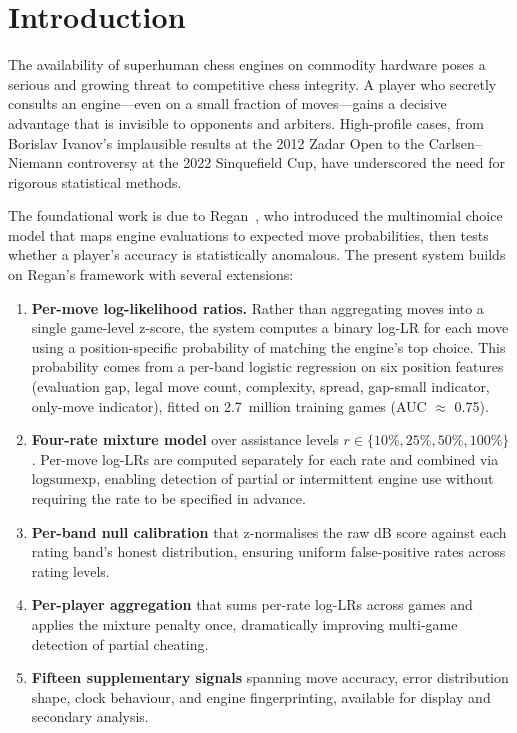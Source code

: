\documentclass[11pt,a4paper]{article}
\theoremstyle{definition}
\begin{document}
\section{Introduction}
\label{sec:intro}

The availability of superhuman chess engines on commodity hardware poses a
serious and growing threat to competitive chess integrity.  A player
who secretly consults an engine---even on a small fraction of
moves---gains a decisive advantage that is invisible to opponents and
arbiters.  High-profile cases, from Borislav Ivanov's implausible
results at the 2012 Zadar Open to the Carlsen--Niemann controversy at
the 2022 Sinquefield Cup, have underscored the need for rigorous
statistical methods.

The foundational work is due to
Regan~\citep{regan2011understanding,regan2014cheating}, who introduced
the multinomial choice model that maps engine evaluations to expected
move probabilities, then tests whether a player's accuracy is
statistically anomalous.  The present system builds on Regan's framework with
several extensions:

\begin{enumerate}[nosep]
  \item \textbf{Per-move log-likelihood ratios.}  Rather than
    aggregating moves into a single game-level z-score, the system
    computes a binary log-LR for each move using a position-specific
    probability of matching the engine's top choice.  This
    probability comes from a per-band logistic regression on six
    position features (evaluation gap, legal move count, complexity,
    spread, gap-small indicator, only-move indicator), fitted on
    2.7~million training games (AUC $\approx$ 0.75).
  \item \textbf{Four-rate mixture model} over assistance levels
    $r \in \{10\%,25\%,50\%,100\%\}$.  Per-move log-LRs are computed
    separately for each rate and combined via $\mathrm{logsumexp}$,
    enabling detection of partial or intermittent engine use without
    requiring the rate to be specified in advance.
  \item \textbf{Per-band null calibration} that z-normalises the raw
    dB score against each rating band's honest distribution, ensuring
    uniform false-positive rates across rating levels.
  \item \textbf{Per-player aggregation} that sums per-rate log-LRs
    across games and applies the mixture penalty once, dramatically
    improving multi-game detection of partial cheating.
  \item \textbf{Fifteen supplementary signals} spanning move accuracy,
    error distribution shape, clock behaviour, and engine
    fingerprinting, available for display and secondary analysis.
\end{enumerate}
\end{document}
